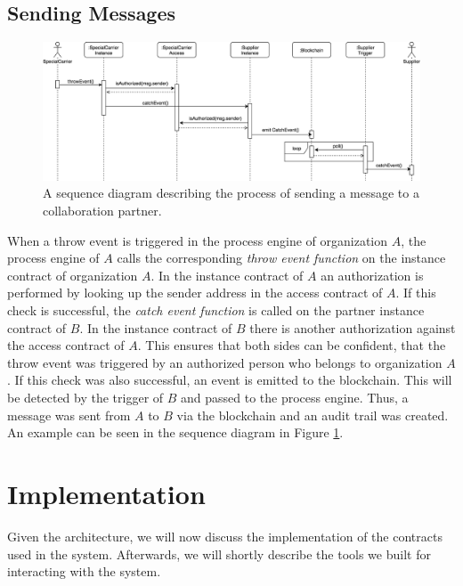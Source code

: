 \documentclass[runningheads]{llncs}
\begin{document}
\subsection{Sending Messages}
\begin{figure}
	\centering
	\includegraphics[width=\textwidth]{fig/event_sending.eps}
	\caption{A sequence diagram describing the process of sending a message to a collaboration partner.}
	\label{fig:event_sending}
\end{figure}

When a throw event is triggered in the process engine of organization $A$, the process engine of $A$ calls the corresponding \emph{throw event function} on the instance contract of organization $A$.
In the instance contract of $A$ an authorization is performed by looking up the sender address in the access contract of $A$.
If this check is successful, the \emph{catch event function} is called on the partner instance contract of $B$.
In the instance contract of $B$ there is another authorization against the access contract of $A$.
This ensures that both sides can be confident, that the throw event was triggered by an authorized person who belongs to organization $A$.
If this check was also successful, an event is emitted to the blockchain.
This will be detected by the trigger of $B$ and passed to the process engine.
Thus, a message was sent from $A$ to $B$ via the blockchain and an audit trail was created.
An example can be seen in the sequence diagram in Figure \ref{fig:event_sending}.

\section{Implementation} \label{implementation}

Given the architecture, we will now discuss the implementation of the contracts used in the system.
Afterwards, we will shortly describe the tools we built for interacting with the system.
\end{document}
